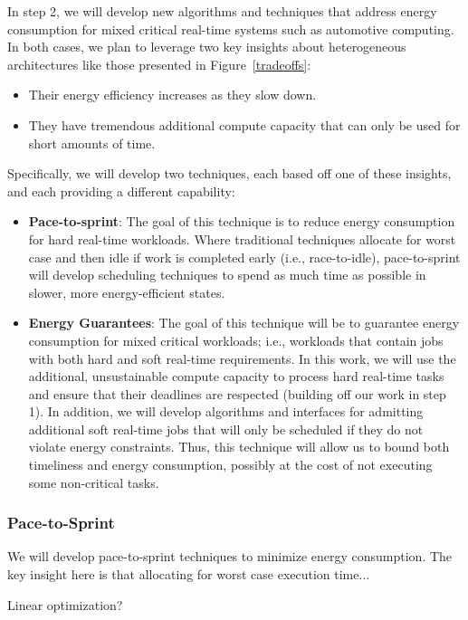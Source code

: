 In step 2, we will develop new algorithms and techniques that address
energy consumption for mixed critical real-time systems such as
automotive computing.  In both cases, we plan to leverage two key
insights about heterogeneous architectures like those presented in
Figure~\ref{tradeoffs}:
\begin{itemize}
\item Their energy efficiency increases as they slow down.
\item They have tremendous additional compute capacity that can only
  be used for short amounts of time.
\end{itemize}

Specifically, we will develop two techniques, each based off one of
these insights, and each providing a different capability:
\begin{itemize}
\item \textbf{Pace-to-sprint}: The goal of this technique is to reduce
  energy consumption for hard real-time workloads.  Where traditional
  techniques allocate for worst case and then idle if work is
  completed early (i.e., race-to-idle), pace-to-sprint will develop
  scheduling techniques to spend as much time as possible in slower,
  more energy-efficient states.
\item \textbf{Energy Guarantees}: The goal of this technique will be
  to guarantee energy consumption for mixed critical workloads; i.e.,
  workloads that contain jobs with both hard and soft real-time
  requirements.  In this work, we will use the additional,
  unsustainable compute capacity to process hard real-time tasks and
  ensure that their deadlines are respected (building off our work in
  step 1).  In addition, we will develop algorithms and interfaces for
  admitting additional soft real-time jobs that will only be scheduled
  if they do not violate energy constraints.  Thus, this technique
  will allow us to bound both timeliness and energy consumption,
  possibly at the cost of not executing some non-critical tasks.
\end{itemize}


\subsubsection{Pace-to-Sprint}
We will develop pace-to-sprint techniques to minimize energy
consumption.  The key insight here is that allocating for worst case
execution time...

Linear optimization?




